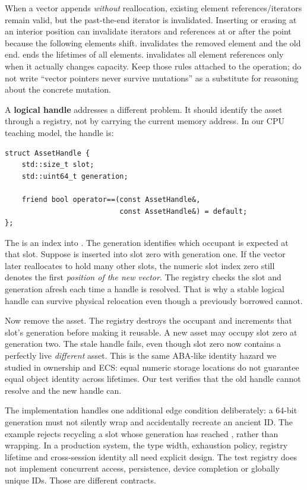 When a vector appends \emph{without} reallocation, existing element references/iterators remain valid, but the past-the-end iterator is invalidated. Inserting or erasing at an interior position can invalidate iterators and references at or after the point because the following elements shift.  invalidates the removed element and the old end.  ends the lifetimes of all elements.  invalidates all element references only when it actually changes capacity. Keep those rules attached to the operation; do not write ``vector pointers never survive mutations'' as a substitute for reasoning about the concrete mutation.

A \textbf{logical handle} addresses a different problem. It should identify the asset through a registry, not by carrying the current memory address. In our CPU teaching model, the handle is:

\begin{verbatim}
struct AssetHandle {
    std::size_t slot;
    std::uint64_t generation;

    friend bool operator==(const AssetHandle&,
                           const AssetHandle&) = default;
};
\end{verbatim}

The  is an index into . The generation identifies which occupant is expected at that slot. Suppose  is inserted into slot zero with generation one. If the vector later reallocates to hold many other slots, the numeric slot index zero still denotes the first \emph{position of the new vector}. The registry checks the slot and generation afresh each time a handle is resolved. That is why a stable logical handle can survive physical relocation even though a previously borrowed  cannot.

Now remove the asset. The registry destroys the occupant and increments that slot's generation before making it reusable. A new asset may occupy slot zero at generation two. The stale handle  fails, even though slot zero now contains a perfectly live \emph{different} asset. This is the same ABA-like identity hazard we studied in ownership and ECS: equal numeric storage locations do not guarantee equal object identity across lifetimes. Our test verifies that the old handle cannot resolve and the new handle can.

The implementation handles one additional edge condition deliberately: a 64-bit generation must not silently wrap and accidentally recreate an ancient ID. The example rejects recycling a slot whose generation has reached , rather than wrapping. In a production system, the type width, exhaustion policy, registry lifetime and cross-session identity all need explicit design. The test registry does not implement concurrent access, persistence, device completion or globally unique IDs. Those are different contracts.

